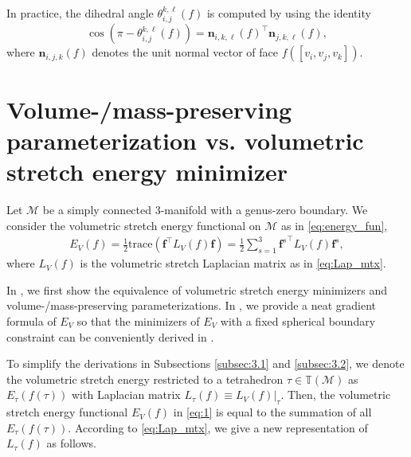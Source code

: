 \documentclass[onefignum,onetabnum]{siamonline220329}
\numberwithin{equation}{section}
\begin{document}
\begin{sloppypar}
\begin{remark}
In practice, the dihedral angle $\theta_{i,j}^{k,\ell}(f)$ is computed by using the identity
$$
\cos(\pi-\theta_{i,j}^{k,\ell}(f)) = \mathbf{n}_{i,k,\ell}(f)^\top \mathbf{n}_{j,k,\ell}(f),
$$
where $\mathbf{n}_{i,j,k}(f)$ denotes the unit normal vector of face $f([v_i,v_j,v_k])$.
\end{remark}

\section{Volume-/mass-preserving parameterization vs. volumetric stretch energy minimizer}
\label{sec:3}

Let $\mathcal{M}$ be a simply connected 3-manifold with a genus-zero boundary. We consider the volumetric stretch energy functional on $\mathcal{M}$ as in \eqref{eq:energy_fun},
\begin{align}
\label{eq:1}
E_V(f)=\frac{1}{2}\textrm{trace}\left(\mathbf{f}^{\top}L_V(f)\mathbf{f}\right)=\frac{1}{2}\sum_{s=1}^3 {\mathbf{f}^s}^{\top}L_V(f)\mathbf{f}^s,
\end{align}
where $L_V(f)$ is the volumetric stretch Laplacian matrix as in \eqref{eq:Lap_mtx}.

In , we first show the equivalence of volumetric stretch energy minimizers and volume-/mass-preserving parameterizations. 
In , we provide a neat gradient formula of $E_V$ so that the minimizers of $E_V$ with a fixed spherical boundary constraint can be conveniently derived in . 

To simplify the derivations in Subsections \ref{subsec:3.1} and \ref{subsec:3.2}, we denote the volumetric stretch energy restricted to a tetrahedron $\tau \in \mathbb{T}(\mathcal{M})$ as $E_{\tau}(f(\tau))$ with Laplacian matrix $L_{\tau}(f) \equiv L_V(f)\rvert_{\tau}$. Then, the volumetric stretch energy functional $E_V(f)$ in \eqref{eq:1} is equal to the summation of all $E_{\tau}(f(\tau))$. According to \eqref{eq:Lap_mtx}, we give a new representation of $L_{\tau}(f)$ as follows.


\end{sloppypar}
\end{document}
